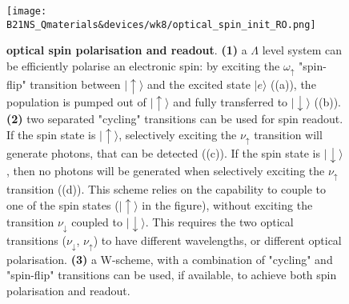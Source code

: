 \documentclass[a4paper,11pt]{article}
\newcommand{\ket}[1]{| #1 \rangle}
\begin{document}
\begin{figure}[h]
    \centering
    \texttt{[image: B21NS\_Qmaterials\&devices/wk8/optical\_spin\_init\_RO.png]}
    \caption{{\bf optical spin polarisation and readout}. {\bf (1)} a $\Lambda$ level system can be efficiently polarise an electronic spin: by exciting the $\omega_{\uparrow}$ "spin-flip" transition between $\ket{\uparrow}$ and the excited state $\ket{e}$ ((a)), the population is pumped out of $\ket{\uparrow}$ and fully transferred to $\ket{\downarrow}$ ((b)). {\bf (2)} two separated "cycling" transitions can be used for spin readout. If the spin state is $\ket{\uparrow}$, selectively exciting the $\nu_{\uparrow}$ transition will generate photons, that can be detected ((c)). If the spin state is $\ket{\downarrow}$, then no photons will be generated when selectively exciting the $\nu_{\uparrow}$ transition ((d)). This scheme relies on the capability to couple to one of the spin states ($\ket{\uparrow}$ in the figure), without exciting the transition $\nu_{\downarrow}$ coupled to $\ket{\downarrow}$. This requires the two optical transitions ($\nu_{\downarrow}$, $\nu_{\uparrow}$) to have different wavelengths, or different optical polarisation. {\bf (3)} a W-scheme, with a combination of "cycling" and "spin-flip" transitions can be used, if available, to achieve both spin polarisation and readout.}
    \label{fig:optical_init_RO}
\end{figure}
\end{document}
